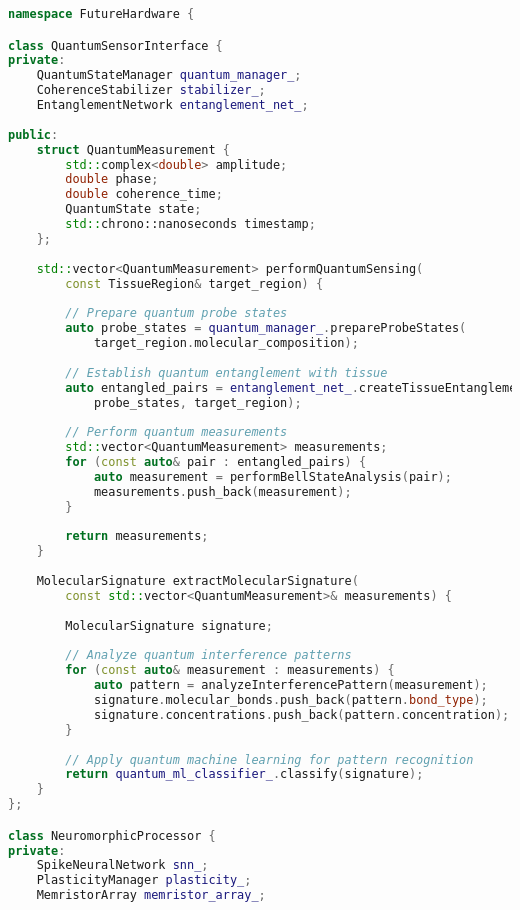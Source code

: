 \begin{lstlisting}[language=C++, caption={Future Hardware Abstraction Layer}, label={lst:future-hardware}]
namespace FutureHardware {

class QuantumSensorInterface {
private:
    QuantumStateManager quantum_manager_;
    CoherenceStabilizer stabilizer_;
    EntanglementNetwork entanglement_net_;
    
public:
    struct QuantumMeasurement {
        std::complex<double> amplitude;
        double phase;
        double coherence_time;
        QuantumState state;
        std::chrono::nanoseconds timestamp;
    };
    
    std::vector<QuantumMeasurement> performQuantumSensing(
        const TissueRegion& target_region) {
        
        // Prepare quantum probe states
        auto probe_states = quantum_manager_.prepareProbeStates(
            target_region.molecular_composition);
        
        // Establish quantum entanglement with tissue
        auto entangled_pairs = entanglement_net_.createTissueEntanglement(
            probe_states, target_region);
        
        // Perform quantum measurements
        std::vector<QuantumMeasurement> measurements;
        for (const auto& pair : entangled_pairs) {
            auto measurement = performBellStateAnalysis(pair);
            measurements.push_back(measurement);
        }
        
        return measurements;
    }
    
    MolecularSignature extractMolecularSignature(
        const std::vector<QuantumMeasurement>& measurements) {
        
        MolecularSignature signature;
        
        // Analyze quantum interference patterns
        for (const auto& measurement : measurements) {
            auto pattern = analyzeInterferencePattern(measurement);
            signature.molecular_bonds.push_back(pattern.bond_type);
            signature.concentrations.push_back(pattern.concentration);
        }
        
        // Apply quantum machine learning for pattern recognition
        return quantum_ml_classifier_.classify(signature);
    }
};

class NeuromorphicProcessor {
private:
    SpikeNeuralNetwork snn_;
    PlasticityManager plasticity_;
    MemristorArray memristor_array_;
    

\end{lstlisting}
